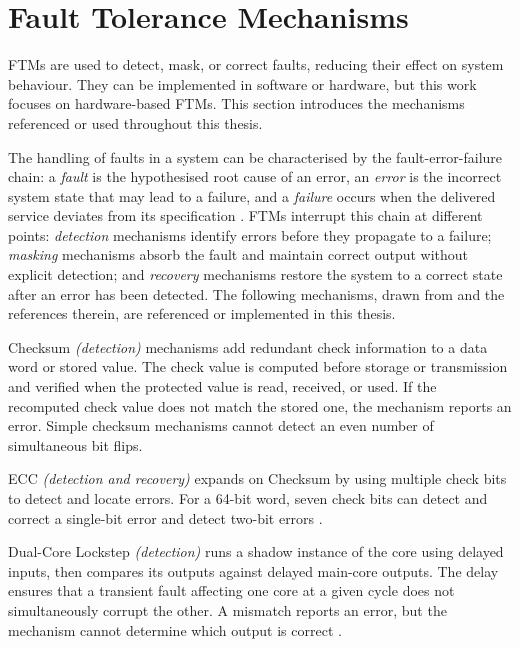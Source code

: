 \section{Fault Tolerance Mechanisms}
\label{chap2:ftms}

\acp{FTM} are used to detect, mask, or correct faults, reducing their effect on system behaviour. They can be implemented in software or hardware, but this work focuses on hardware-based \acp{FTM}. This section introduces the mechanisms referenced or used throughout this thesis.

The handling of faults in a system can be characterised by the fault-error-failure chain: a \emph{fault} is the hypothesised root cause of an error, an \emph{error} is the incorrect system state that may lead to a failure, and a \emph{failure} occurs when the delivered service deviates from its specification \cite{Avizienis2004}. \acp{FTM} interrupt this chain at different points: \emph{detection} mechanisms identify errors before they propagate to a failure; \emph{masking} mechanisms absorb the fault and maintain correct output without explicit detection; and \emph{recovery} mechanisms restore the system to a correct state after an error has been detected. The following mechanisms, drawn from \cite{Kastensmidt2006} and the references therein, are referenced or implemented in this thesis.

Checksum \emph{(detection)} mechanisms add redundant check information to a data word or stored value. The check value is computed before storage or transmission and verified when the protected value is read, received, or used. If the recomputed check value does not match the stored one, the mechanism reports an error. Simple checksum mechanisms cannot detect an even number of simultaneous bit flips.

\ac{ECC} \emph{(detection and recovery)} expands on Checksum by using multiple check bits to detect and locate errors. For a 64-bit word, seven check bits can detect and correct a single-bit error and detect two-bit errors \cite{Hamming1950}.

Dual-Core Lockstep \emph{(detection)} runs a shadow instance of the core using delayed inputs, then compares its outputs against delayed main-core outputs. The delay ensures that a transient fault affecting one core at a given cycle does not simultaneously corrupt the other. A mismatch reports an error, but the mechanism cannot determine which output is correct \cite{ibex}.


